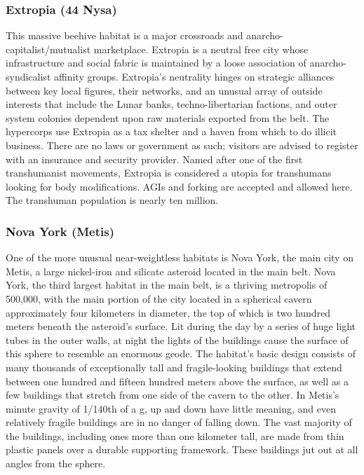 \subsubsection{Extropia (44 Nysa)}

This massive beehive habitat is a major crossroads 
and anarcho-capitalist/mutualist marketplace. Extropia
is a neutral free city whose infrastructure and
social fabric is maintained by a loose association of 
anarcho-syndicalist affinity groups. Extropia's neutrality
hinges on strategic alliances between key local
figures, their networks, and an unusual array of outside
interests that include the Lunar banks, techno-libertarian
factions, and outer system colonies dependent
upon raw materials exported from the belt. The
hypercorps use Extropia as a tax shelter and a haven 
from which to do illicit business. There are no laws 
or government as such; visitors are advised to register 
with an insurance and security provider. Named after 
one of the first transhumanist movements, Extropia 
is considered a utopia for transhumans looking for 
body modifications. AGIs and forking are accepted 
and allowed here. The transhuman population is 
nearly ten million.

\subsubsection{Nova York (Metis)}

One of the more unusual near-weightless habitats is 
Nova York, the main city on Metis, a large nickel-iron 
and silicate asteroid located in the main belt. Nova 
York, the third largest habitat in the main belt, is a 
thriving metropolis of 500,000, with the main portion 
of the city located in a spherical cavern approximately 
four kilometers in diameter, the top of which is two 
hundred meters beneath the asteroid's surface. Lit 
during the day by a series of huge light tubes in the 
outer walls, at night the lights of the buildings cause 
the surface of this sphere to resemble an enormous 
geode. The habitat's basic design consists of many 
thousands of exceptionally tall and fragile-looking 
buildings that extend between one hundred and fifteen 
hundred meters above the surface, as well as a few 
buildings that stretch from one side of the cavern to 
the other. In Metis's minute gravity of 1/140th of a g, 
up and down have little meaning, and even relatively 
fragile buildings are in no danger of falling down. The 
vast majority of the buildings, including ones more 
than one kilometer tall, are made from thin plastic 
panels over a durable supporting framework. These 
buildings jut out at all angles from the sphere.

